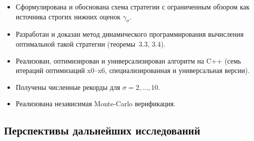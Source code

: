 \begin{itemize}
    \item Сформулирована и обоснована схема стратегии с ограниченным обзором как источника строгих нижних оценок $\gamma_\sigma$.
    \item Разработан и доказан метод динамического программирования вычисления оптимальной такой стратегии (теоремы~3.3, 3.4).
    \item Реализован, оптимизирован и универсализирован алгоритм на C++ (семь итераций оптимизаций x0--x6, специализированная и универсальная версии).
    \item Получены численные рекорды для $\sigma = 2, \ldots, 10$.
    \item Реализована независимая Monte-Carlo верификация.
\end{itemize}

\subsection*{Перспективы дальнейших исследований}


